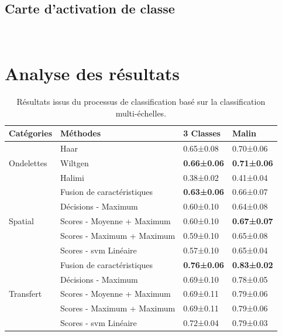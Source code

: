 \subsection{Carte d'activation de classe}
~\cite{jia2017}
\section{Analyse des résultats}

\begin{table}[H]
    \centering
    \begin{tabular}{llll}
        \toprule
        Catégories                  & Méthodes                  & 3 Classes         & Malin             \\ \midrule
        \multirow{3}{*}{Ondelettes} & Haar                      & 0.65±0.08         & 0.70±0.06         \\
                                    & Wiltgen~\cite{Wiltgen2008}& \textbf{0.66±0.06}& \textbf{0.71±0.06}\\
                                    & Halimi~\cite{Halimi2017a} & 0.38±0.02         & 0.41±0.04         \\ \midrule
        \multirow{5}{*}{Spatial}    & Fusion de caractéristiques& \textbf{0.63±0.06}& 0.66±0.07         \\
                                    & Décisions - Maximum       & 0.60±0.10         & 0.64±0.08         \\
                                    & Scores - Moyenne + Maximum& 0.60±0.10         & \textbf{0.67±0.07}\\
                                    & Scores - Maximum + Maximum& 0.59±0.10         & 0.65±0.08         \\
                                    & Scores - \gls{svm} Linéaire& 0.57±0.10        & 0.65±0.04         \\ \midrule
        \multirow{5}{*}{Transfert}  & Fusion de caractéristiques& \textbf{0.76±0.06}& \textbf{0.83±0.02}\\
                                    & Décisions - Maximum       & 0.69±0.10         & 0.78±0.05         \\
                                    & Scores - Moyenne + Maximum& 0.69±0.11         & 0.79±0.06         \\
                                    & Scores - Maximum + Maximum& 0.69±0.11         & 0.79±0.06         \\
                                    & Scores - \gls{svm} Linéaire& 0.72±0.04        & 0.79±0.03         \\
        \bottomrule
    \end{tabular}
    \label{tab:image_improvement_multiresolution}
    \caption{Résultats issus du processus de classification basé sur la classification multi-échelles.}
\end{table}


